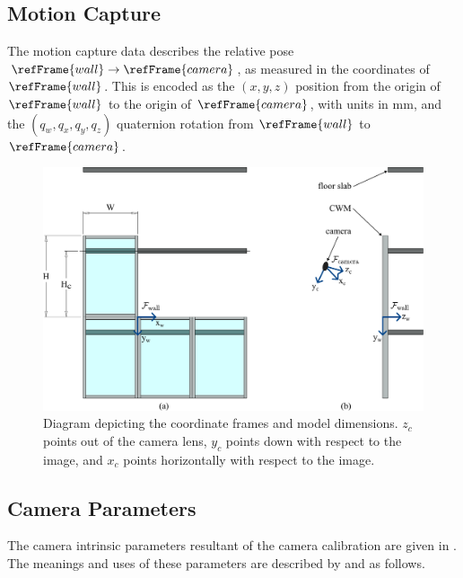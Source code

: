 \subsection*{Motion Capture}
The motion capture data describes the relative pose $\refFrame{wall}\rightarrow\refFrame{camera}$, as measured in the coordinates of $\refFrame{wall}$. This is encoded as the $(x, y, z)$ position from the origin of $\refFrame{wall}$ to the origin of $\refFrame{camera}$, with units in mm, and the $(q_w, q_x, q_y, q_z)$ quaternion rotation from $\refFrame{wall}$ to $\refFrame{camera}$.

\begin{figure}[!t]
	\centering
	\centerline{\includegraphics[width=1\columnwidth,keepaspectratio]{fig/ExpDimensions.pdf}}
	\caption{Diagram depicting the coordinate frames and model dimensions. $z_c$ points out of the camera lens, $y_c$ points down with respect to the image, and $x_c$ points horizontally with respect to the image.}
    \label{fig:ExpDimensions}
\end{figure}


\subsection*{Camera Parameters}
The camera intrinsic parameters resultant of the camera calibration are given in . The meanings and uses of these parameters are described by \cite{BJ4-53,BJ4-54,BJb-02,BJb-03} and as follows.

